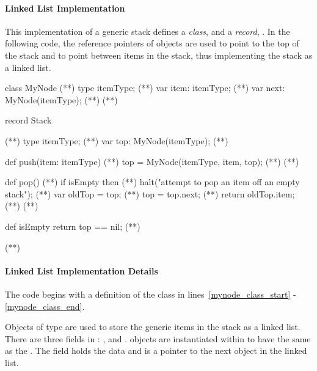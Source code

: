 \paragraph{Linked List Implementation}
This implementation of a generic stack defines a {\em class},
 and a {\em record}, .  In the following
code, the reference pointers of  objects are used to point to
the top of the stack and to point between items in the stack,
thus implementing the stack as a linked list.

\begin{numberedchapel}
class MyNode {                      (*\label{mynode_class_start}*)
  type itemType;                    (*\label{mynode_itemtype}*)
  var item: itemType;               (*\label{mynode_item}*)
  var next: MyNode(itemType);       (*\label{mynode_next}*)
}                                   (*\label{mynode_class_end}*)

record Stack {                      (*\label{stack_list_start}*)
  type itemType;                    (*\label{stack_list_itemtype}*)
  var top: MyNode(itemType);        (*\label{stack_list_top}*)

  def push(item: itemType) {        (*\label{stack_list_push_start}*)
    top = MyNode(itemType, item, top); (*\label{stack_list_push_top}*)
  }                                 (*\label{stack_list_push_end}*)

  def pop() {                       (*\label{stack_list_pop_start}*)
    if isEmpty then                 (*\label{stack_list_pop_empty_1}*)
      halt("attempt to pop an item off an empty stack"); (*\label{stack_list_empty_2}*)
    var oldTop = top;               (*\label{stack_list_pop_oldtop}*)
    top = top.next;                 (*\label{stack_list_pop_newtop}*)
    return oldTop.item;             (*\label{stack_list_pop_return}*)
  }                                 (*\label{stack_list_pop_end}*)

  def isEmpty return top == nil;   (*\label{stack_list_isempty}*)
}                                  (*\label{stack_list_end}*)
\end{numberedchapel}

\paragraph{Linked List Implementation Details}
The code begins with a definition of the  class in 
lines~\ref{mynode_class_start} - \ref{mynode_class_end}.  
\begin{chapel}
class MyNode {                      
  type itemType;                   
  var item: itemType;             
  var next: MyNode(itemType);    
\end{chapel}
Objects of type  are used to store the generic items in the stack
as a linked list.  There are three fields in :  , 
 and
.   objects are instantiated within  to
have the same  as the .  The  field
holds the data and  is a pointer to the next  object
in the linked list.

